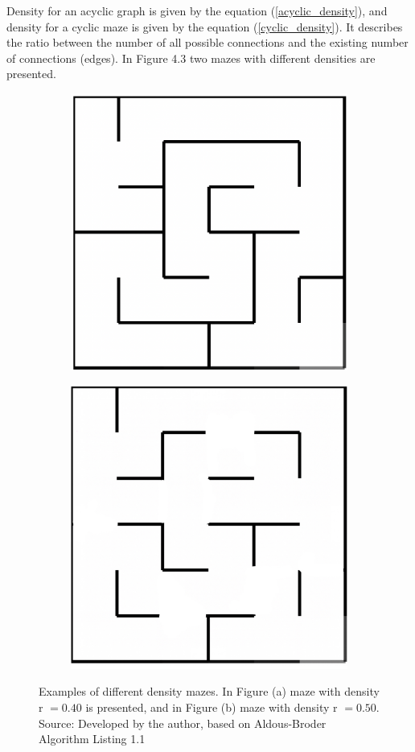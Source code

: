 Density for an acyclic graph is given by the equation (\ref{acyclic_density}), and density for a cyclic maze is given by the equation (\ref{cyclic_density}).
It describes the ratio between the number of all possible connections and the existing number of connections (edges).
\newpage
In Figure 4.3 two mazes with different
densities are presented.
\begin{figure}[!h]
\centering
\begin{subfigure}{.5\textwidth}
\centering
\includegraphics[width=.5\linewidth]{recursivedens}
\caption{}
\label{fig:sub1}
\end{subfigure}%
\begin{subfigure}{.5\textwidth}
\centering
\includegraphics[width=.5\linewidth]{recursivedensecyclic}
\caption{}
\label{fig:sub2}
\end{subfigure}
\caption{Examples of different density mazes. In Figure (a) maze with density r $= 0.40$ is presented, and in Figure (b) maze with density r $ = 0.50$.\\Source: Developed by the author,  based on Aldous-Broder Algorithm Listing 1.1}
\label{fig:test}
\end{figure}

\newpage
